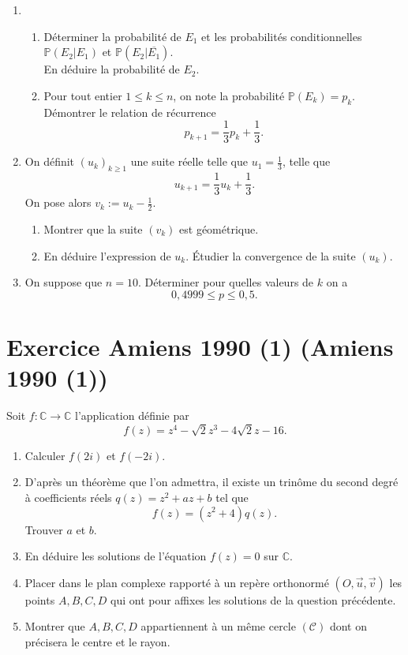 \documentclass{article}
\makeatletter
\newcommand{\CC}{\mathbb C}
\newcommand{\PP}{\mathbb P}
\newcounter{Exercice}
\newcommand{\exercice}[1][\@nil]{\refstepcounter{Exercice}
	\section*{Exercice \theExercice
	\def\tmp{#1}
	\ifx\tmp\@nnil
	\else
	(#1)
	\fi
}}
\makeatother
\begin{document}
\begin{enumerate}
	\item \begin{enumerate}
		\item Déterminer la probabilité de $E_1$ et les probabilités conditionnelles $\PP(E_2|E_1)$ et $\PP(E_2|\overline{E_1})$.\\
		En déduire la probabilité de $E_2$.
		\item Pour tout entier $1\leq k\leq n$, on note la probabilité $\PP(E_k) = p_k$.\\
		Démontrer le relation de récurrence
		\[ p_{k+1} = \frac 1 3 p_k + \frac 1 3. \]
	\end{enumerate}
	\item On définit $(u_k)_{k\geq 1}$ une suite réelle telle que $u_1= \frac 1 3$, telle que 
	\[ u_{k+1} = \frac 1 3 u_k + \frac 1 3.\]
	On pose alors $v_k := u_k - \frac 1 2$.
	\begin{enumerate}
		\item Montrer que la suite $(v_k)$ est géométrique.
		\item En déduire l'expression de $u_k$. Étudier la convergence de la suite $(u_k)$.
	\end{enumerate}
	\item On suppose que $n=10$. Déterminer pour quelles valeurs de $k$ on a
	\[ 0{,}4999\leq p \leq 0{,}5. \]
\end{enumerate}

\exercice[Amiens 1990 (1)]

Soit $f\colon\CC\rightarrow\CC$ l'application définie par
\[ f(z) = z^4 - \sqrt 2 z^3 - 4\sqrt 2 z - 16. \]

\begin{enumerate}
	\item Calculer $f(2i)$ et $f(-2i)$.
	\item D'après un théorème que l'on admettra, il existe un trinôme du second degré à coefficients réels $q(z)= z^2+az+b$ tel que
	\[ f(z) = (z^2+4)q(z). \]
	Trouver $a$ et $b$.
	\item En déduire les solutions de l'équation $f(z) = 0$ sur $\CC$.
	\item Placer dans le plan complexe rapporté à un repère orthonormé $(O,\vec u,\vec v)$ les points $A,B,C,D$ qui ont pour affixes les solutions de la question précédente.
	\item Montrer que $A,B,C,D$ appartiennent à un même cercle $(\mathcal{C})$ dont on précisera le centre et le rayon.
\end{enumerate}
\end{document}
